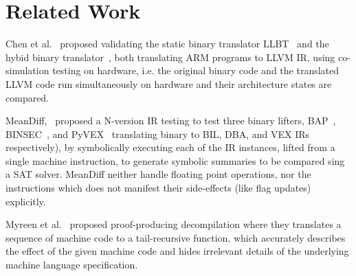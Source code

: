 \section{Related Work}\label{sec:related-work}
Chen et al.~\cite{CLSS2015} proposed validating the static binary translator
LLBT~\cite{LLBT2012} and the hybid binary translator~\cite{LLVMDBT2012}, both
translating ARM programs to LLVM IR,  using co-simulation testing on hardware,
            i.e. the original binary code and the translated LLVM  code run
            simultaneously on hardware and their architecture states are
            compared.

MeanDiff,~\cite{ASE2017} proposed a N-version IR testing to test three binary lifters, BAP~\cite{BAP:CAV11}, BINSEC~\cite{BINSEC2011}, and PyVEX~\cite{PYVEX} translating binary to BIL, DBA, and VEX IRs respectively), by symbolically executing each of the IR instances, lifted from a single machine instruction, to generate symbolic summaries to be compared sing a SAT solver. MeanDiff neither handle floating point operations, nor the instructions which does not manifest their side-effects (like flag updates) explicitly.

Myreen et al.~\cite{Myreen:FMCAD:2008,Myreen:FMCAD:2012} proposed proof-producing decompilation where they translates a sequence of machine code to a tail-recursive function, which accurately describes the effect of the given machine code and hides irrelevant details of the underlying machine language specification.
